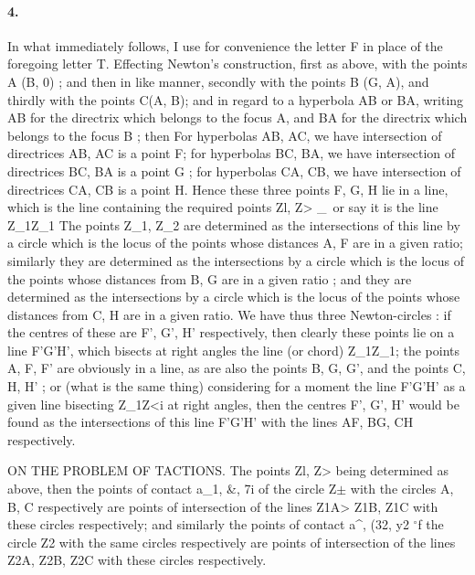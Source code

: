 \documentclass[11pt,a4paper]{book}
\begin{document}
\paragraph{4.} In   what   immediately    follows,   I    use   for   convenience   the   letter   F   in   place   of
the  foregoing  letter  T.
Effecting  Newton's  construction,  first  as  above,  with  the  points  A  (B,  0) ;  and
then  in  like  manner,  secondly  with  the  points  B  (G,  A),  and  thirdly  with  the  points
C(A,  B);  and  in  regard  to  a  hyperbola  AB  or  BA,  writing  AB  for  the  directrix
which  belongs  to  the  focus  A,  and  BA  for  the  directrix  which  belongs  to  the  focus
B  ;  then
For  hyperbolas  AB,  AC,  we  have  intersection  of  directrices  AB,  AC  is  a  point
F;  for  hyperbolas  BC,  BA,  we  have  intersection  of  directrices  BC,  BA  is  a  point
G ;  for  hyperbolas  CA,  CB,  we  have  intersection  of  directrices  CA,  CB  is  a  point  H.
Hence  these  three  points  F,  G,  H  lie  in  a  line,  which  is  the  line  containing
the  required  points  Zl,  Z> \_\  or  say  it  is  the  line  Z_1Z_1
The  points  Z_1,  Z_2  are  determined  as  the  intersections  of  this  line  by  a  circle
which  is  the  locus  of  the  points  whose  distances  A,  F  are  in  a  given  ratio;  similarly
they  are  determined  as  the  intersections  by  a  circle  which  is  the  locus  of  the  points
whose  distances  from  B,  G  are  in  a  given  ratio ;  and  they  are  determined  as  the
intersections  by  a  circle  which  is  the  locus  of  the  points  whose  distances  from  C,  H
are  in  a  given  ratio.  We  have  thus  three  Newton-circles :  if  the  centres  of  these
are  F',  G',  H'  respectively,  then  clearly  these  points  lie  on  a  line  F'G'H',  which
bisects  at  right  angles  the  line  (or  chord)  Z_1Z_1;  the  points  A,  F,  F'  are  obviously
in  a  line,  as  are  also  the  points  B,  G,  G',  and  the  points  C,  H,  H' ;  or  (what  is
the  same  thing)  considering  for  a  moment  the  line  F'G'H'  as  a  given  line  bisecting
Z_1Z<i  at  right  angles,  then  the  centres  F',  G',  H'  would  be  found  as  the  intersections
of  this  line  F'G'H'  with  the  lines  AF,  BG,  CH  respectively.


ON    THE    PROBLEM    OF    TACTIONS.
The  points  Zl,  Z>   being  determined  as  above,  then  the  points  of  contact  a_1,  \&,
7i  of  the  circle  Z$\pm$  with  the  circles  A,  B,  C  respectively  are  points  of  intersection
of  the  lines  Z1A>  Z1B,  Z1C  with  these  circles  respectively;  and  similarly  the  points
of  contact  a^,  (32,  y2  $^\circ$f  the  circle  Z2  with  the  same  circles  respectively  are  points  of
intersection  of  the  lines  Z2A,  Z2B,  Z2C  with  these  circles  respectively.
\end{document}
